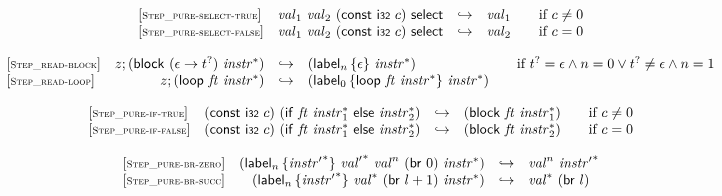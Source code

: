 \documentclass{article}
\begin{document}
$$
\begin{array}{@{}l@{}rcl@{}l@{}}
	{[\textsc{\scriptsize Step\_pure{-}select{-}true}]} \quad & {\mathit{val}}_1~{\mathit{val}}_2~(\mathsf{const}~\mathsf{i{\scriptstyle 32}}~c)~\mathsf{select} &\hookrightarrow& {\mathit{val}}_1
	&\qquad \mbox{if}~c \neq 0 \\
	{[\textsc{\scriptsize Step\_pure{-}select{-}false}]} \quad & {\mathit{val}}_1~{\mathit{val}}_2~(\mathsf{const}~\mathsf{i{\scriptstyle 32}}~c)~\mathsf{select} &\hookrightarrow& {\mathit{val}}_2
	&\qquad \mbox{if}~c = 0 \\
\end{array}
$$

\vspace{1ex}

$$
\begin{array}{@{}l@{}rcl@{}l@{}}
	{[\textsc{\scriptsize Step\_read{-}block}]} \quad & z ; (\mathsf{block}~(\epsilon \rightarrow {t^?})~{{\mathit{instr}}^\ast}) &\hookrightarrow& ({\mathsf{label}}_{n}\,\{ \epsilon \}~{{\mathit{instr}}^\ast})
	&\qquad \mbox{if}~{t^?} = \epsilon \land n = 0 \lor {t^?} \neq \epsilon \land n = 1 \\
	{[\textsc{\scriptsize Step\_read{-}loop}]} \quad & z ; (\mathsf{loop}~{\mathit{ft}}~{{\mathit{instr}}^\ast}) &\hookrightarrow& ({\mathsf{label}}_{0}\,\{ \mathsf{loop}~{\mathit{ft}}~{{\mathit{instr}}^\ast} \}~{{\mathit{instr}}^\ast}) \\
\end{array}
$$

$$
\begin{array}{@{}l@{}rcl@{}l@{}}
	{[\textsc{\scriptsize Step\_pure{-}if{-}true}]} \quad & (\mathsf{const}~\mathsf{i{\scriptstyle 32}}~c)~(\mathsf{if}~{\mathit{ft}}~{{\mathit{instr}}_1^\ast}~\mathsf{else}~{{\mathit{instr}}_2^\ast}) &\hookrightarrow& (\mathsf{block}~{\mathit{ft}}~{{\mathit{instr}}_1^\ast})
	&\qquad \mbox{if}~c \neq 0 \\
	{[\textsc{\scriptsize Step\_pure{-}if{-}false}]} \quad & (\mathsf{const}~\mathsf{i{\scriptstyle 32}}~c)~(\mathsf{if}~{\mathit{ft}}~{{\mathit{instr}}_1^\ast}~\mathsf{else}~{{\mathit{instr}}_2^\ast}) &\hookrightarrow& (\mathsf{block}~{\mathit{ft}}~{{\mathit{instr}}_2^\ast})
	&\qquad \mbox{if}~c = 0 \\
\end{array}
$$

\vspace{1ex}

$$
\begin{array}{@{}l@{}rcl@{}l@{}}
	{[\textsc{\scriptsize Step\_pure{-}br{-}zero}]} \quad & ({\mathsf{label}}_{n}\,\{ {{\mathit{instr}'}^\ast} \}~{{\mathit{val}'}^\ast}~{{\mathit{val}}^{n}}~(\mathsf{br}~0)~{{\mathit{instr}}^\ast}) &\hookrightarrow& {{\mathit{val}}^{n}}~{{\mathit{instr}'}^\ast} \\
	{[\textsc{\scriptsize Step\_pure{-}br{-}succ}]} \quad & ({\mathsf{label}}_{n}\,\{ {{\mathit{instr}'}^\ast} \}~{{\mathit{val}}^\ast}~(\mathsf{br}~l + 1)~{{\mathit{instr}}^\ast}) &\hookrightarrow& {{\mathit{val}}^\ast}~(\mathsf{br}~l) \\
\end{array}
$$
\end{document}

